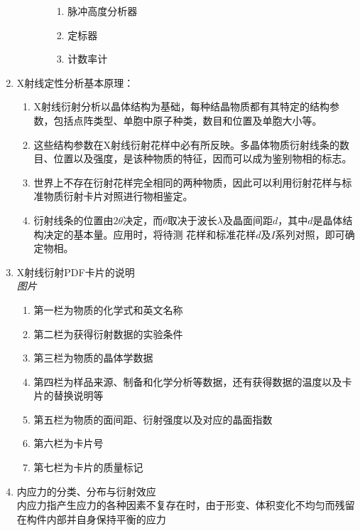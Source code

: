 \documentclass[12pt,a4paper]{article}
\begin{document}
\begin{enumerate}
\begin{enumerate}
\begin{enumerate}
                    \begin{enumerate}
                        \item 脉冲高度分析器
                        \item 定标器
                        \item 计数率计
                    \end{enumerate}
                \end{enumerate}
            \end{enumerate}
        \item X射线定性分析基本原理：
            \begin{enumerate}
                \item X射线衍射分析以晶体结构为基础，每种结晶物质都有其特定的结构参数，包括点阵类型、单胞中原子种类，数目和位置及单胞大小等。
                \item 这些结构参数在X射线衍射花样中必有所反映。多晶体物质衍射线条的数目、位置以及强度，是该种物质的特征，因而可以成为鉴别物相的标志。
                \item 世界上不存在衍射花样完全相同的两种物质，因此可以利用衍射花样与标准物质衍射卡片对照进行物相鉴定。
                \item 衍射线条的位置由$2\theta$决定，而$\theta$取决于波长$\lambda$及晶面间距$d$，其中$d$是晶体结构决定的基本量。应用时，将待测
                    花样和标准花样$d$及$I$系列对照，即可确定物相。
            \end{enumerate}
        \item X射线衍射PDF卡片的说明 \\\emph{图片}
            \begin{enumerate}
                \item 第一栏为物质的化学式和英文名称
                \item 第二栏为获得衍射数据的实验条件
                \item 第三栏为物质的晶体学数据
                \item 第四栏为样品来源、制备和化学分析等数据，还有获得数据的温度以及卡片的替换说明等
                \item 第五栏为物质的面间距、衍射强度以及对应的晶面指数
                \item 第六栏为卡片号
                \item 第七栏为卡片的质量标记
            \end{enumerate}
        \item 内应力的分类、分布与衍射效应
        \\内应力指产生应力的各种因素不复存在时，由于形变、体积变化不均匀而残留在构件内部并自身保持平衡的应力

\end{enumerate}
\end{document}
